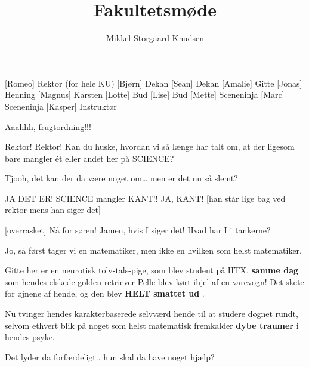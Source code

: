 \documentclass[a4paper,11pt]{article}
\title{Fakultetsmøde}
\author{Mikkel Storgaard Knudsen}
\begin{document}
\maketitle

\begin{roles}
  [Romeo] Rektor (for hele KU)
  [Bjørn] Dekan
  [Sean] Dekan
  [Amalie] Gitte
  [Jonas] Henning
  [Magnus] Karsten
  [Lotte] Bud
  [Lise] Bud
  [Mette] Sceneninja
  [Marc] Sceneninja
  [Kasper] Instruktør
\end{roles}

\begin{sketch}
 Aaahhh, frugtordning!!! 

 Rektor! Rektor!  Kan du huske, hvordan vi så længe har talt om, at der ligesom bare mangler ét eller andet her på SCIENCE?

 Tjooh, det kan der da være noget om\ldots {} men er det nu så slemt?

 JA DET ER! SCIENCE mangler KANT!! 
 JA, KANT! [han står lige bag ved rektor mens han siger det] 

[overrasket] Nå for søren! Jamen, hvis I siger det! Hvad har I i tankerne?

 Jo, så først tager vi en matematiker, men ikke en hvilken som helst matematiker.


 Gitte her er en neurotisk tolv-tals-pige, som blev student på HTX, \textbf{samme dag} som hendes elskede golden retriever Pelle blev kørt ihjel af en varevogn!  Det skete for øjnene af hende, og den blev \textbf{HELT smattet ud} .

 Nu tvinger hendes karakterbaserede selvværd hende til at studere døgnet rundt, selvom ethvert blik på noget som helst matematisk fremkalder \textbf{dybe traumer} i hendes psyke.

 Det lyder da forfærdeligt.. hun skal da have noget hjælp?


\end{sketch}
\end{document}
